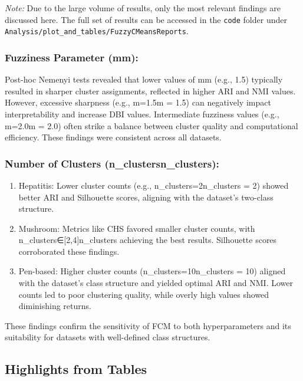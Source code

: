 \textit{Note:} Due to the large volume of results, only the most relevant findings are discussed here. The full set of results can be accessed in the \texttt{code} folder under \texttt{Analysis/plot_and_tables/FuzzyCMeansReports}.


\subsubsection*{Fuzziness Parameter (mm):}

Post-hoc Nemenyi tests revealed that lower values of mm (e.g., 1.5) typically resulted in sharper cluster assignments, reflected in higher ARI and NMI values. However, excessive sharpness (e.g., m=1.5m = 1.5) can negatively impact interpretability and increase DBI values. Intermediate fuzziness values (e.g., m=2.0m = 2.0) often strike a balance between cluster quality and computational efficiency. These findings were consistent across all datasets.


\subsubsection*{Number of Clusters (n_clustersn\_clusters):}

\begin{enumerate}

\item Hepatitis: Lower cluster counts (e.g., n_clusters=2n\_clusters = 2) showed better ARI and Silhouette scores, aligning with the dataset's two-class structure.

\item Mushroom: Metrics like CHS favored smaller cluster counts, with n_clusters∈[2,4]n\_clusters \in [2, 4] achieving the best results. Silhouette scores corroborated these findings.

\item Pen-based: Higher cluster counts (n_clusters=10n\_clusters = 10) aligned with the dataset's class structure and yielded optimal ARI and NMI. Lower counts led to poor clustering quality, while overly high values showed diminishing returns.

\end{enumerate}

These findings confirm the sensitivity of FCM to both hyperparameters and its suitability for datasets with well-defined class structures.



\subsection*{Highlights from Tables}

